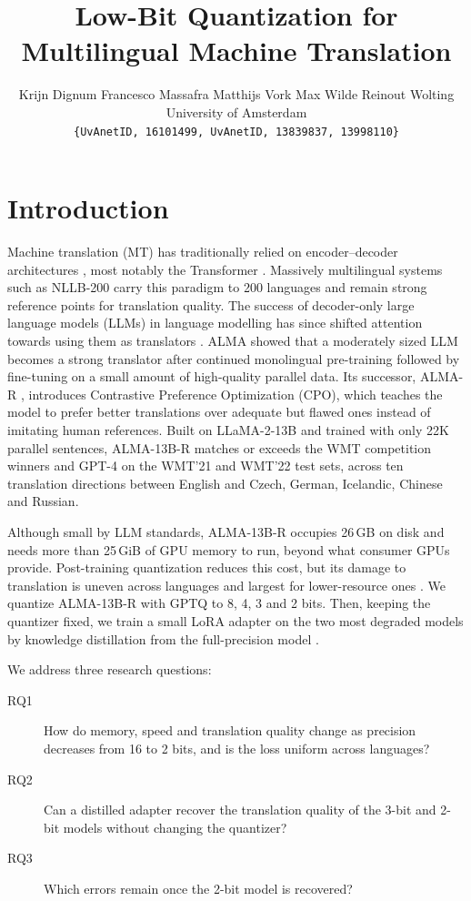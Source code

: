 \documentclass[10pt]{article}
\title{Low-Bit Quantization for Multilingual Machine Translation}
\author{
  Krijn Dignum \quad Francesco Massafra \quad Matthijs Vork \quad
  Max Wilde \quad Reinout Wolting \\
  University of Amsterdam \\
  \small\texttt{\{UvAnetID, 16101499, UvAnetID, 13839837, 13998110\}}
}
\begin{document}
\maketitle

\section{Introduction}

Machine translation (MT) has traditionally relied on encoder--decoder
architectures \citep{sutskever2014seq2seq,bahdanau2015neural}, most notably the
Transformer \citep{vaswani2017attention}. Massively multilingual systems such as
NLLB-200 \citep{nllb2022} carry this paradigm to 200 languages and remain strong
reference points for translation quality. The success of decoder-only large
language models (LLMs) in language modelling \citep{brown2020gpt3,touvron2023llama2}
has since shifted attention towards using them as translators \citep{hendy2023gpt}.
ALMA \citep{xu2024alma} showed that a moderately sized LLM becomes a strong
translator after continued monolingual pre-training followed by fine-tuning on a
small amount of high-quality parallel data. Its successor, ALMA-R
\citep{xu2024cpo}, introduces Contrastive Preference Optimization (CPO), which
teaches the model to prefer better translations over adequate but flawed ones
instead of imitating human references. Built on LLaMA-2-13B and trained with only
22K parallel sentences, ALMA-13B-R matches or exceeds the WMT competition winners
and GPT-4 on the WMT'21 and WMT'22 test sets, across ten translation directions
between English and Czech, German, Icelandic, Chinese and Russian.

Although small by LLM standards, ALMA-13B-R occupies 26\,GB on disk and needs
more than 25\,GiB of GPU memory to run, beyond what consumer GPUs provide.
Post-training quantization \citep{frantar2023gptq} reduces this cost, but its
damage to translation is uneven across languages and largest for lower-resource
ones \citep{marchisio2024quantization}. We quantize ALMA-13B-R with GPTQ to 8, 4,
3 and 2 bits. Then, keeping the quantizer fixed, we train a small LoRA adapter
\citep{hu2022lora} on the two most degraded models by knowledge distillation
from the full-precision model \citep{hinton2015distilling}. 

We address three research questions:

\begin{description}
  \item[RQ1] How do memory, speed and translation quality change as precision
             decreases from 16 to 2 bits, and is the loss uniform across
             languages?
  \item[RQ2] Can a distilled adapter recover the translation quality of the
             3-bit and 2-bit models without changing the quantizer?
  \item[RQ3] Which errors remain once the 2-bit model is recovered?
\end{description}
\end{document}
